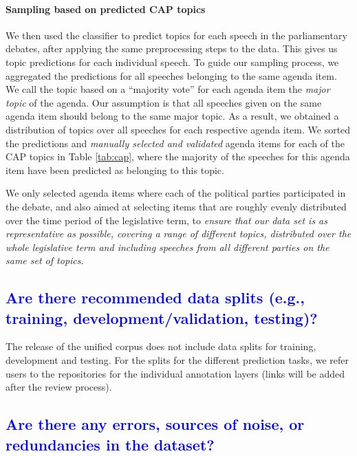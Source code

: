 \documentclass[letterpaper, 10 pt, conference]{ieeeconf}  %
\begin{document}
\paragraph{Sampling based on predicted CAP topics} We then used the classifier to predict topics for each speech in the parliamentary debates, after applying the same preprocessing steps to the data. This gives us topic predictions for each individual speech.
To guide our sampling process, we aggregated the predictions for all speeches belonging to the same agenda item. We call the topic based on a ``majority vote'' for each agenda item the {\em major topic} of the agenda. 
Our assumption is that all speeches given on the same agenda item should belong to the same major topic. 
As a result, we obtained a distribution of topics over all speeches for each respective agenda item. 
We sorted the predictions and {\em manually selected and validated} agenda items for each of the CAP topics in Table \ref{tab:cap}, where the majority of the speeches for this agenda item have been predicted as belonging to this topic. 

We only selected agenda items where each of the political parties participated in the debate, and also aimed at selecting items that are roughly evenly distributed over the time period of the legislative term, to {\em ensure that our data set is as representative as possible, covering a range of different topics, distributed over the whole legislative term and including speeches from all different parties on the same set of topics}.





\textcolor{blue}{\subsection{Are there recommended data splits (e.g., training, development/validation, testing)?}} %

The release of the unified corpus does not include data splits for training, development and testing. 
For the splits for the different prediction tasks, we refer users to the repositories for the individual annotation layers (links will be added after the review process).




\textcolor{blue}{\subsection{Are there any errors, sources of noise, or redundancies in the dataset?}} %
\end{document}
